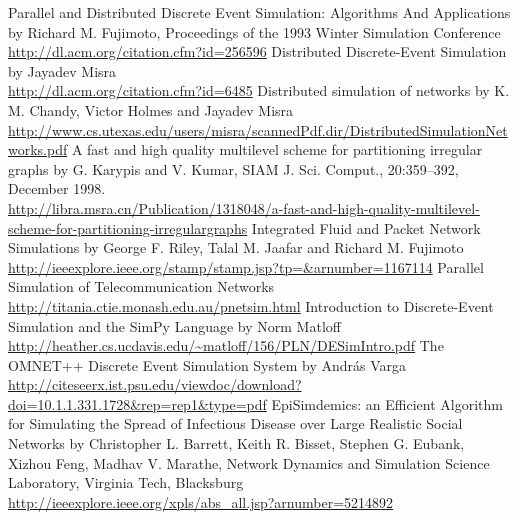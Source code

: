\documentclass[12pt,a4paper]{article}
\begin{document}
\begin{thebibliography}{99}
Parallel and Distributed Discrete Event Simulation: Algorithms And Applications by Richard M. Fujimoto, Proceedings of the 1993 Winter Simulation Conference
\\ \url{http://dl.acm.org/citation.cfm?id=256596}
Distributed Discrete-Event Simulation by Jayadev Misra
\\ \url{http://dl.acm.org/citation.cfm?id=6485}
Distributed simulation of networks by K. M. Chandy, Victor Holmes and Jayadev Misra
\\ \url{http://www.cs.utexas.edu/users/misra/scannedPdf.dir/DistributedSimulationNetworks.pdf}
A fast and high quality multilevel scheme for partitioning irregular graphs by G. Karypis and V. Kumar, SIAM J. Sci. Comput., 20:359–392, December 1998.
\\ \url{http://libra.msra.cn/Publication/1318048/a-fast-and-high-quality-multilevel-scheme-for-partitioning-irregulargraphs}
Integrated Fluid and Packet Network Simulations by George F. Riley, Talal M. Jaafar and Richard M. Fujimoto
\\ \url{http://ieeexplore.ieee.org/stamp/stamp.jsp?tp=&arnumber=1167114}
Parallel Simulation of Telecommunication Networks \url{http://titania.ctie.monash.edu.au/pnetsim.html}
Introduction to Discrete-Event Simulation and the SimPy Language by Norm Matloff
\\ \url{http://heather.cs.ucdavis.edu/~matloff/156/PLN/DESimIntro.pdf}
The OMNET++ Discrete Event Simulation System by András Varga
\\ \url{http://citeseerx.ist.psu.edu/viewdoc/download?doi=10.1.1.331.1728&rep=rep1&type=pdf}
EpiSimdemics: an Efficient Algorithm for Simulating the Spread of Infectious Disease over Large Realistic Social Networks by Christopher L. Barrett, Keith R. Bisset, Stephen G. Eubank, Xizhou Feng, Madhav V. Marathe, Network Dynamics and Simulation Science Laboratory, Virginia Tech, Blacksburg
\\ \url{http://ieeexplore.ieee.org/xpls/abs_all.jsp?arnumber=5214892}
\end{thebibliography}
\end{document}
